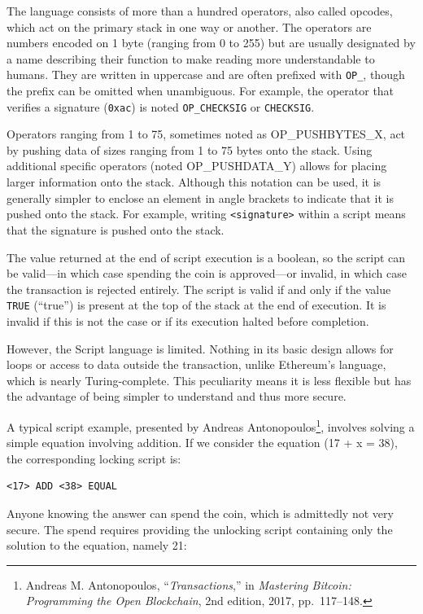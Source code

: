 \documentclass[
  a5paper,
  smalldemyvopaper,10pt,twoside,onecolumn,openright,extrafontsizes,hidelinks]{memoir}
\begin{document}
The language consists of more than a hundred operators, also called
opcodes, which act on the primary stack in one way or another. The
operators are numbers encoded on 1 byte (ranging from 0 to 255) but are
usually designated by a name describing their function to make reading
more understandable to humans. They are written in uppercase and are
often prefixed with \texttt{OP\_}, though the prefix can be omitted when
unambiguous. For example, the operator that verifies a signature
(\texttt{0xac}) is noted \texttt{OP\_CHECKSIG} or \texttt{CHECKSIG}.

Operators ranging from 1 to 75, sometimes noted as OP\_PUSHBYTES\_X, act
by pushing data of sizes ranging from 1 to 75 bytes onto the stack.
Using additional specific operators (noted OP\_PUSHDATA\_Y) allows for
placing larger information onto the stack. Although this notation can be
used, it is generally simpler to enclose an element in angle brackets to
indicate that it is pushed onto the stack. For example, writing
\texttt{\textless{}signature\textgreater{}} within a script means that
the signature is pushed onto the stack.

The value returned at the end of script execution is a boolean, so the
script can be valid---in which case spending the coin is approved---or
invalid, in which case the transaction is rejected entirely. The script
is valid if and only if the value \texttt{TRUE} (``true'') is present at
the top of the stack at the end of execution. It is invalid if this is
not the case or if its execution halted before completion.

However, the Script language is limited. Nothing in its basic design
allows for loops or access to data outside the transaction, unlike
Ethereum's language, which is nearly Turing-complete. This peculiarity
means it is less flexible but has the advantage of being simpler to
understand and thus more secure.

A typical script example, presented by Andreas Antonopoulos\footnote{Andreas
  M. Antonopoulos, ``\emph{Transactions},'' in \emph{Mastering Bitcoin:
  Programming the Open Blockchain}, 2nd edition, 2017, pp.~117--148.},
involves solving a simple equation involving addition. If we consider
the equation (17 + x = 38), the corresponding locking script is:

\begin{verbatim}
<17> ADD <38> EQUAL
\end{verbatim}

Anyone knowing the answer can spend the coin, which is admittedly not
very secure. The spend requires providing the unlocking script
containing only the solution to the equation, namely 21:
\end{document}
